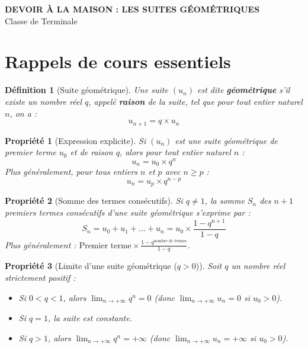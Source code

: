 \documentclass[11pt,a4paper]{article}
\newtheorem{definition}{Définition}
\newtheorem{propriete}{Propriété}
\begin{document}
\begin{center}
    {\LARGE \textbf{DEVOIR À LA MAISON : LES SUITES GÉOMÉTRIQUES}} \\[0.3cm]
    {\large Classe de Terminale}
\end{center}

\vspace{0.5cm}

\section{Rappels de cours essentiels}

\begin{definition}[Suite géométrique]
Une suite $(u_n)$ est dite \textbf{géométrique} s'il existe un nombre réel $q$, appelé \textbf{raison} de la suite, tel que pour tout entier naturel $n$, on a :
\[u_{n+1} = q \times u_n\]
\end{definition}

\begin{propriete}[Expression explicite]
Si $(u_n)$ est une suite géométrique de premier terme $u_0$ et de raison $q$, alors pour tout entier naturel $n$ :
\[u_n = u_0 \times q^n\]
Plus généralement, pour tous entiers $n$ et $p$ avec $n \geq p$ :
\[u_n = u_p \times q^{n-p}\]
\end{propriete}

\begin{propriete}[Somme des termes consécutifs]
Si $q \neq 1$, la somme $S_n$ des $n+1$ premiers termes consécutifs d'une suite géométrique s'exprime par :
\[S_n = u_0 + u_1 + \dots + u_n = u_0 \times \frac{1 - q^{n+1}}{1 - q}\]
Plus généralement : $\text{Premier terme} \times \frac{1 - q^{\text{nombre de termes}}}{1 - q}$.
\end{propriete}

\begin{propriete}[Limite d'une suite géométrique ($q > 0$)]
Soit $q$ un nombre réel strictement positif :
\begin{itemize}
    \item Si $0 < q < 1$, alors $\lim_{n \to +\infty} q^n = 0$ (donc $\lim_{n \to +\infty} u_n = 0$ si $u_0 > 0$).
    \item Si $q = 1$, la suite est constante.
    \item Si $q > 1$, alors $\lim_{n \to +\infty} q^n = +\infty$ (donc $\lim_{n \to +\infty} u_n = +\infty$ si $u_0 > 0$).
\end{itemize}
\end{propriete}
\end{document}
